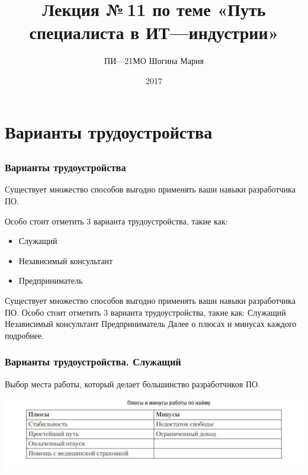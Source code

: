 \documentclass{../industrial-development}
\title{ Лекция №\,11 по теме «Путь специалиста в ИТ---индустрии»}
\author{ПИ---21МО Шогина Мария}
\date{2017 }
\begin{document}
\begin{frame}
  \titlepage
\end{frame}

\section{Варианты трудоустройства }

\subsection{}

\begin{frame} \frametitle{Варианты трудоустройства}
  \begin{block}{}
  Существует множество способов выгодно применять ваши навыки разработчика ПО. 

Особо стоит отметить 3 варианта трудоустройства, такие как:
  \end{block}
  
  \begin{itemize}
  \item Служащий
  \item Независимый консультант
  \item Предприниматель
  \end{itemize}
\end{frame}

\lecturenotes
 Существует множество способов выгодно применять ваши навыки разработчика ПО. Особо стоит отметить 3 варианта трудоустройства, такие как:
Служащий
 Независимый консультант
Предприниматель
Далее о плюсах и минусах каждого подробнее.

\begin{frame} \frametitle{Варианты трудоустройства. Служащий}
  \begin{block}{}
    Выбор места работы, который делает большинство разработчиков ПО. 
  \end{block}
  
  \centerline{\includegraphics[height=0.38\textheight]{11-IT-specialist's-way/sl.pdf}}
\end{frame}
\end{document}
